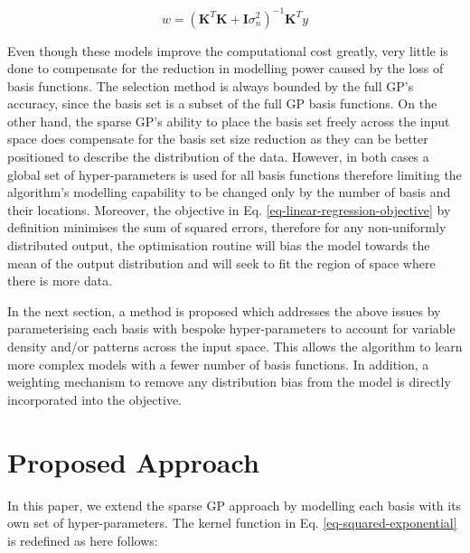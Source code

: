 \documentclass[useAMS,usenatbib,fleqn]{mn2e}
\newcommand{\bm}[1]{\mathbf{#1} }
\begin{document}
\begin{equation}
\label{eq-linear-regression-objective-rectangular}
w = \left(\bm{K}^{T}\bm{K}+\bm{I}\sigma_{n}^{2} \right)^{-1}\bm{K}^{T}y
\end{equation}

Even though these models improve the computational cost greatly, very little is done to compensate for the reduction in modelling power caused by the loss of basis functions. The selection method is always bounded by the full GP's accuracy, since the basis set is a subset of the full GP basis functions. On the other hand, the sparse GP's ability to place the basis set freely across the input space does compensate for the basis set size reduction as they can be better positioned to describe the distribution of the data. However, in both cases a global set of hyper-parameters is used for all basis functions therefore limiting the algorithm's modelling capability to be changed only by the number of basis and their locations. Moreover, the objective in Eq. \eqref{eq-linear-regression-objective} by definition minimises the sum of squared errors, therefore for any non-uniformly distributed output, the optimisation routine will bias the model towards the mean of the output distribution and will seek to fit the region of space where there is more data.

In the next section, a method is proposed which addresses the above issues by parameterising each basis with bespoke hyper-parameters to account for variable density and/or patterns across the input space. This allows the algorithm to learn more complex models with a fewer number of basis functions. In addition, a weighting mechanism to remove any distribution bias from the model is directly incorporated into the objective.

\section{Proposed Approach}
\label{sec-proposed-approach}

In this paper, we extend the sparse GP approach by modelling each basis with its own set of hyper-parameters. The kernel function in Eq. \eqref{eq-squared-exponential} is redefined as here follows:
\end{document}
